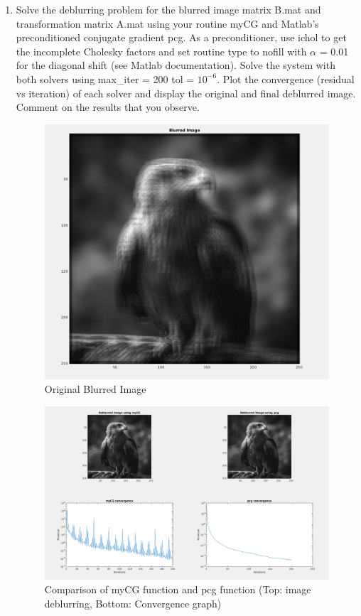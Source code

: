 \documentclass[unicode,11pt,a4paper,oneside,numbers=endperiod,openany]{scrartcl}
\begin{document}
\begin{enumerate}
 \item Solve the deblurring problem for the blurred image matrix B.mat and transformation matrix A.mat using
your routine myCG and Matlab’s preconditioned conjugate gradient pcg. As a preconditioner, use ichol to
get the incomplete Cholesky factors and set routine type to nofill with ${\alpha}$ = 0.01  for the diagonal shift (see Matlab documentation). Solve the system with both solvers using max\_iter = 200 tol = ${10^{-6}}$. Plot the
convergence (residual vs iteration) of each solver and display the original and final deblurred image. Comment
on the results that you observe. \\

 \begin{figure}[h!]
    \begin{minipage}[c]{1\linewidth}
        \centering
        \includegraphics[width=0.4\linewidth]{./figures/ex4a2.png}
    \end{minipage}
  \caption{Original Blurred Image}
\end{figure}

 \begin{figure}[h!]
    \begin{minipage}[c]{1\linewidth}
        \centering
        \includegraphics[width=0.9\linewidth]{./figures/ex4a.png}
    \end{minipage}
  \caption{Comparison of myCG function and pcg function (Top: image deblurring, Bottom: Convergence graph)}
\end{figure}


\end{enumerate}
\end{document}
